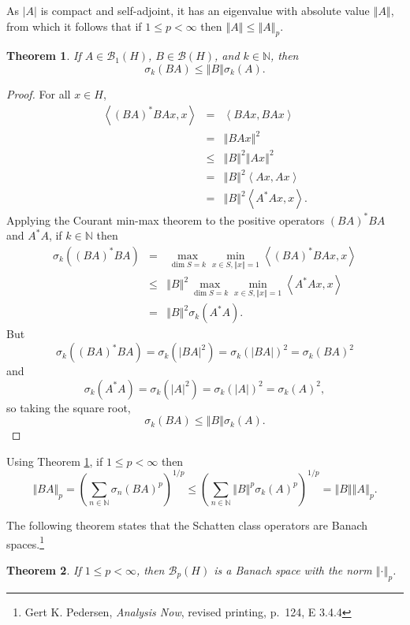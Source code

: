 \documentclass{article}
\newcommand{\inner}[2]{\left\langle #1, #2 \right\rangle}
\newcommand{\norm}[1]{\left\Vert #1 \right\Vert}
\newtheorem{theorem}{Theorem}
\theoremstyle{definition}
\begin{document}
As $|A|$ is compact and self-adjoint, it has an eigenvalue with absolute value $\norm{A}$, from which it follows that if $1 \leq p < \infty$ then
$\norm{A} \leq \norm{A}_p$.



\begin{theorem}
If $A \in \mathscr{B}_1(H)$, $B \in \mathscr{B}(H)$, and  $k \in \mathbb{N}$, then
\[
\sigma_k(BA) \leq \norm{B} \sigma_k(A).
\]
\label{singularproduct}
\end{theorem}
\begin{proof}
For all $x \in H$,
\begin{eqnarray*}
\inner{(BA)^*BAx}{x}&=&\inner{BAx}{BAx}\\
&=&\norm{BAx}^2\\
&\leq&\norm{B}^2 \norm{Ax}^2\\
&=&\norm{B}^2 \inner{Ax}{Ax}\\
&=&\norm{B}^2 \inner{A^*Ax}{x}.
\end{eqnarray*}
Applying the Courant min-max theorem to the positive operators $(BA)^*BA$ and $A^*A$, if $k \in \mathbb{N}$ then
\begin{eqnarray*}
\sigma_k((BA)^*BA)&=&\max_{\dim S=k} \min_{x \in S, \norm{x}=1} \inner{(BA)^*BAx}{x}\\
&\leq&\norm{B}^2 \max_{\dim S=k} \min_{x \in S, \norm{x}=1} \inner{A^*Ax}{x}\\
&=&\norm{B}^2 \sigma_k(A^*A).
\end{eqnarray*}
But
\[
\sigma_k((BA)^*BA)=\sigma_k(|BA|^2)=\sigma_k(|BA|)^2=\sigma_k(BA)^2
\]
and
\[
\sigma_k(A^*A)=\sigma_k(|A|^2)=\sigma_k(|A|)^2=\sigma_k(A)^2,
\]
so taking the square root,
\[
\sigma_k(BA) \leq \norm{B} \sigma_k(A).
\]
\end{proof}

Using Theorem \ref{singularproduct}, if $1 \leq p < \infty$ then
\[
\norm{BA}_p=\left( \sum_{n \in \mathbb{N}} \sigma_n(BA)^p \right)^{1/p}
\leq \left( \sum_{n \in \mathbb{N}} \norm{B}^p \sigma_k(A)^p \right)^{1/p}
=\norm{B} \norm{A}_p.
\]

The following theorem states that the Schatten class operators are Banach spaces.\footnote{Gert K. Pedersen,
{\em Analysis Now}, revised printing, p.~124, E 3.4.4} 

\begin{theorem}
If $1 \leq p < \infty$, then $\mathscr{B}_p(H)$ is a Banach space with the norm $\norm{\cdot}_p$.
\end{theorem}
\end{document}
